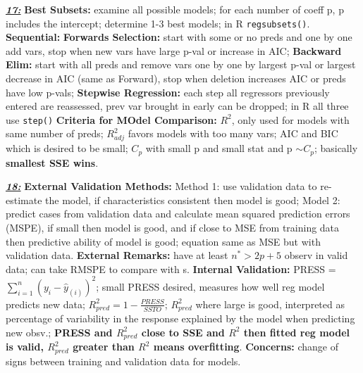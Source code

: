 \documentclass[8pt]{extarticle}
\begin{document}
\textit{\textbf{\underline{17:}}}
\textbf{Best Subsets:} examine all possible models; for each number of coeff p, 
p includes the intercept; determine 1-3 best models; in R \texttt{regsubsets()}.
\textbf{Sequential:} \textbf{Forwards Selection:} start with some or no preds 
and one by one add vars, stop when new vars have large p-val or increase in 
AIC; \textbf{Backward Elim:} start with all preds and remove vars one by one 
by largest p-val or largest decrease in AIC (same as Forward), stop when 
deletion increases AIC or preds have low p-vals; \textbf{Stepwise Regression:} 
each step all regressors previously entered are reassessed, prev var brought in 
early can be dropped; in R all three use \texttt{step()}
\textbf{Criteria for MOdel Comparison:} $R^2$, only used for models with same 
number of preds; $R^2_{adj}$ favors models with too many vars; AIC and BIC which 
is desired to be small; $C_p$ with small p and small stat and p $\sim C_p$; 
basically \textbf{smallest SSE wins}.

\textit{\textbf{\underline{18:}}}
\textbf{External Validation Methods:} Method 1: use validation data to 
re-estimate the model, if characteristics consistent then model is good; Model 2:
predict cases from validation data and calculate mean squared prediction errors 
(MSPE), if small then model is good, and if close to MSE from training data 
then predictive ability of model is good; equation same as MSE but with 
validation data.
\textbf{External Remarks:} have at least $n^* > 2p + 5$ observ in valid data; 
can take RMSPE to compare with s.
\textbf{Internal Validation:} PRESS = $\sum_{i=1}^{n} (y_i - \hat{y}_{(i)})^2$;
small PRESS desired, measures how well reg model predicts new data; $R^2_{pred} 
= 1 - \frac{PRESS}{SSTO}$; $R^2_{pred}$ where large is good, interpreted as 
percentage of variability in the response explained by the model when predicting
new obsv.; \textbf{PRESS and $R^2_{pred}$ close to SSE and $R^2$ then fitted 
reg model is valid, $R^2_{pred}$ greater than $R^2$ means overfitting}.
\textbf{Concerns:} change of signs between training and validation data for 
models.


\end{document}
